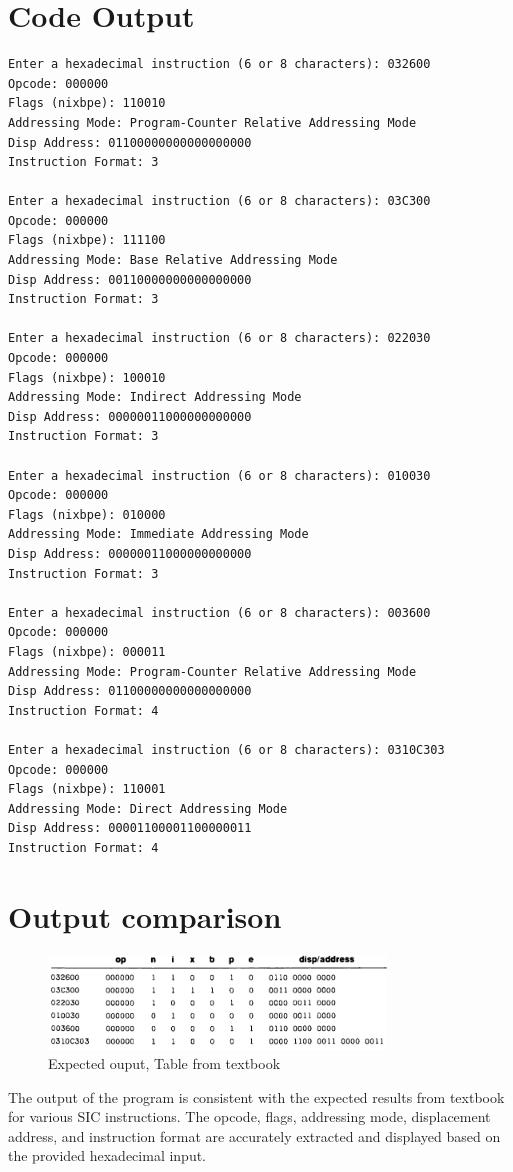\documentclass[12pt]{article}
\begin{document}
\section{Code Output}
\begin{verbatim}
Enter a hexadecimal instruction (6 or 8 characters): 032600
Opcode: 000000
Flags (nixbpe): 110010
Addressing Mode: Program-Counter Relative Addressing Mode
Disp Address: 01100000000000000000
Instruction Format: 3

Enter a hexadecimal instruction (6 or 8 characters): 03C300
Opcode: 000000
Flags (nixbpe): 111100
Addressing Mode: Base Relative Addressing Mode
Disp Address: 00110000000000000000
Instruction Format: 3

Enter a hexadecimal instruction (6 or 8 characters): 022030
Opcode: 000000
Flags (nixbpe): 100010
Addressing Mode: Indirect Addressing Mode
Disp Address: 00000011000000000000
Instruction Format: 3

Enter a hexadecimal instruction (6 or 8 characters): 010030
Opcode: 000000
Flags (nixbpe): 010000
Addressing Mode: Immediate Addressing Mode
Disp Address: 00000011000000000000
Instruction Format: 3

Enter a hexadecimal instruction (6 or 8 characters): 003600
Opcode: 000000
Flags (nixbpe): 000011
Addressing Mode: Program-Counter Relative Addressing Mode
Disp Address: 01100000000000000000
Instruction Format: 4

Enter a hexadecimal instruction (6 or 8 characters): 0310C303
Opcode: 000000
Flags (nixbpe): 110001
Addressing Mode: Direct Addressing Mode
Disp Address: 00001100001100000011
Instruction Format: 4
\end{verbatim}


\section{Output comparison}
\begin{figure}[H]
    \centering
    \includegraphics[width=0.8\textwidth]{Sample.png}
    \caption{Expected ouput, Table from textbook} 
    \label{fig:output}
\end{figure}
The output of the program is consistent with the expected results from textbook for various SIC instructions. The opcode, flags, addressing mode, displacement address, and instruction format are accurately extracted and displayed based on the provided hexadecimal input.
\end{document}
